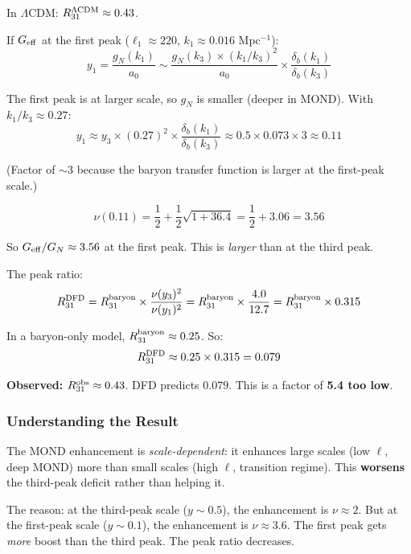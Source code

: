\documentclass[11pt,a4paper]{article}
\begin{document}
In $\Lambda$CDM: $R_{31}^{\rm \Lambda CDM} \approx 0.43$.

If $G_{\rm eff}$ at the first peak ($\ell_1 \approx 220$, $k_1 \approx 0.016$ Mpc$^{-1}$):
\begin{equation}
y_1 = \frac{g_N(k_1)}{a_0} \sim \frac{g_N(k_3) \times (k_1/k_3)^2}{a_0} \times \frac{\delta_b(k_1)}{\delta_b(k_3)}
\end{equation}

The first peak is at larger scale, so $g_N$ is smaller (deeper in MOND). With $k_1/k_3 \approx 0.27$:
\begin{equation}
y_1 \approx y_3 \times (0.27)^2 \times \frac{\delta_b(k_1)}{\delta_b(k_3)} \approx 0.5 \times 0.073 \times 3 \approx 0.11
\end{equation}

(Factor of $\sim$3 because the baryon transfer function is larger at the first-peak scale.)

\begin{equation}
\nu(0.11) = \frac{1}{2} + \frac{1}{2}\sqrt{1 + 36.4} = \frac{1}{2} + 3.06 = 3.56
\end{equation}

So $G_{\rm eff}/G_N \approx 3.56$ at the first peak. This is \emph{larger} than at the third peak.

The peak ratio:
\begin{equation}
R_{31}^{\rm DFD} = R_{31}^{\rm baryon} \times \frac{\nu(y_3)^2}{\nu(y_1)^2} = R_{31}^{\rm baryon} \times \frac{4.0}{12.7} = R_{31}^{\rm baryon} \times 0.315
\end{equation}

In a baryon-only model, $R_{31}^{\rm baryon} \approx 0.25$. So:
\begin{equation}
R_{31}^{\rm DFD} \approx 0.25 \times 0.315 = 0.079
\end{equation}

\textbf{Observed:} $R_{31}^{\rm obs} \approx 0.43$. DFD predicts $0.079$. This is a factor of \textbf{5.4 too low}.

\subsubsection{Understanding the Result}

The MOND enhancement is \emph{scale-dependent}: it enhances large scales (low $\ell$, deep MOND) more than small scales (high $\ell$, transition regime). This \textbf{worsens} the third-peak deficit rather than helping it.

The reason: at the third-peak scale ($y \sim 0.5$), the enhancement is $\nu \approx 2$. But at the first-peak scale ($y \sim 0.1$), the enhancement is $\nu \approx 3.6$. The first peak gets \emph{more} boost than the third peak. The peak ratio decreases.
\end{document}
